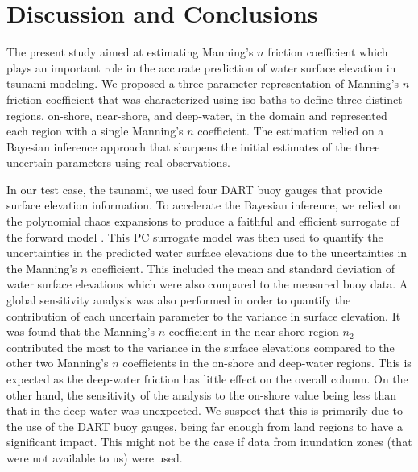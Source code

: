 \section{Discussion and Conclusions}
\label{sec:conc}

The present study aimed at estimating Manning's $n$ friction coefficient  which
plays an important role in the accurate prediction of water surface elevation in
tsunami modeling. We proposed a three-parameter representation of Manning's $n$
friction coefficient that was characterized using iso-baths  to define three
distinct regions, on-shore, near-shore, and deep-water, in the domain and
represented each region with a single Manning's $n$ coefficient.  The estimation
relied on a Bayesian inference approach that sharpens the initial estimates of
the three uncertain parameters using real observations.

In our test case, the \tohoku tsunami, we used four DART buoy gauges that
provide  surface elevation information.  To accelerate the Bayesian inference,
we relied on the polynomial  chaos expansions to produce a faithful and
efficient surrogate of the forward model \geoclaw.  This PC surrogate model was
then used to quantify the uncertainties in the predicted water surface
elevations due to the uncertainties in the Manning's $n$ coefficient.  This
included the mean and standard deviation of water surface elevations which were
also compared to the measured buoy data.  A global sensitivity analysis was also
performed in order to quantify the contribution of each uncertain parameter to
the variance in surface elevation.  It was found that the Manning's $n$
coefficient in the near-shore region $n_2$ contributed the most to the variance
in the surface elevations compared to the other two Manning's $n$ coefficients
in the on-shore and deep-water regions.  This is expected as the deep-water
friction has little effect on the overall column.  On the other hand, the
sensitivity of the analysis to the on-shore value being less than that in the
deep-water was unexpected. We suspect that this is primarily due to the use of the
DART buoy gauges, being far enough from land regions to have a significant impact. 
This might not be the case if data from inundation zones (that
were not available to us) were used. 

